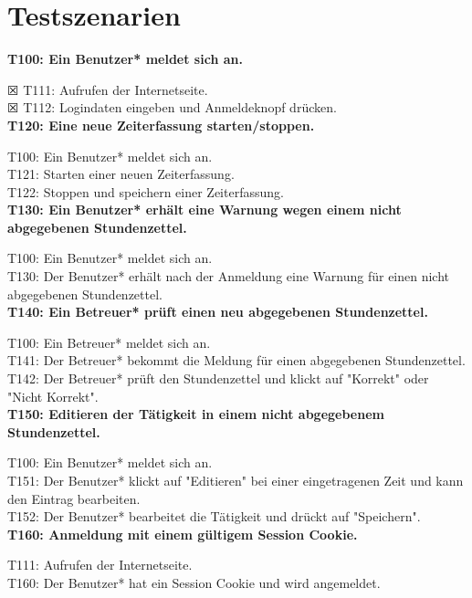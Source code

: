 \section{Testszenarien}


\textbf{T100: Ein Benutzer* meldet sich an.} 

$\XBox$ T111: Aufrufen der Internetseite. \\
$\XBox$ T112: Logindaten eingeben und Anmeldeknopf drücken. \\

\textbf{T120: Eine neue Zeiterfassung starten/stoppen.}

T100: Ein Benutzer* meldet sich an. \\
T121: Starten einer neuen Zeiterfassung. \\
T122: Stoppen und speichern einer Zeiterfassung. \\

\textbf{T130: Ein Benutzer* erhält eine Warnung wegen einem nicht abgegebenen Stundenzettel.}

T100: Ein Benutzer* meldet sich an. \\
T130: Der Benutzer* erhält nach der Anmeldung eine Warnung für einen nicht abgegebenen Stundenzettel. \\

\textbf{T140: Ein Betreuer* prüft einen neu abgegebenen Stundenzettel.}

T100: Ein Betreuer* meldet sich an. \\
T141: Der Betreuer* bekommt die Meldung für einen abgegebenen Stundenzettel. \\
T142: Der Betreuer* prüft den Stundenzettel und klickt auf "Korrekt" oder "Nicht Korrekt". \\

\textbf{T150: Editieren der Tätigkeit in einem nicht abgegebenem Stundenzettel.}

T100: Ein Benutzer* meldet sich an. \\
T151: Der Benutzer* klickt auf "Editieren" bei einer eingetragenen Zeit und kann den Eintrag bearbeiten. \\
T152: Der Benutzer* bearbeitet die Tätigkeit und drückt auf "Speichern". \\

\textbf{T160: Anmeldung mit einem gültigem Session Cookie.}

T111: Aufrufen der Internetseite. \\
T160: Der Benutzer* hat ein Session Cookie und wird angemeldet. \\

